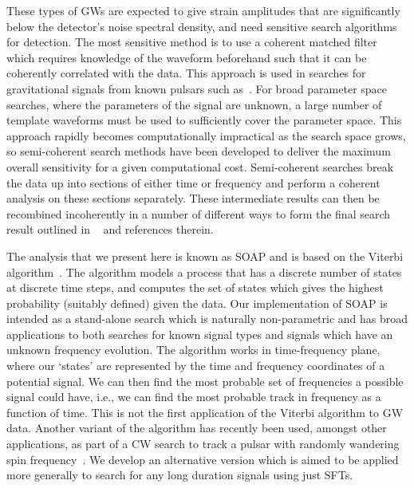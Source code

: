 %
%
These types of \acp{GW} are expected to give strain amplitudes that are significantly below the detector's noise spectral density, and need sensitive search algorithms for detection. The most sensitive method is to use a coherent matched filter which requires knowledge of the waveform beforehand such that it can be coherently correlated with the data. This approach is used in searches for gravitational signals from known pulsars such as~\citep{dupuis2005BayesianEstimation,astone2010MethodDetection,schutz1998DataAnalysis,collaboration2017FirstSearch,abbott2019SearchesGravitational}. For broad parameter space searches, where the parameters of the signal are unknown, a large number of template waveforms must be used to sufficiently cover the parameter space.  This approach rapidly becomes computationally impractical as the search space grows, so semi-coherent search methods have been developed to deliver the maximum overall sensitivity for a given computational cost. Semi-coherent searches break the data up into sections of either time or frequency and perform a coherent analysis on these sections separately. These intermediate results can then be recombined incoherently in a number of different ways to form the final search result outlined in ~\citep{creighton2000SearchingPeriodic,abbott2019AllskySearch} and references therein.


%
%
The analysis that we present here is known as SOAP \citep{ellis2006SnakesPlanea} and is based on the Viterbi algorithm~\citep{viterbi1967ErrorBounds}. The algorithm models a process that has a discrete number of states at discrete time steps, and computes the set of states which gives the highest probability (suitably defined) given the data. Our implementation of SOAP is intended as a stand-alone search which is naturally non-parametric and has broad applications to both searches for known signal types and signals which have an unknown frequency evolution. The algorithm works in time-frequency plane, where our `states' are represented by the time and frequency coordinates of a potential signal. We can then find the most probable set of frequencies a possible signal could have, i.e., we can find the most probable track in frequency as a function of time. This is not the first application of the Viterbi algorithm to \ac{GW} data. Another variant of the algorithm \citep{suvorova2016HiddenMarkova} has recently been used, amongst other applications, as part of a \ac{CW} search to track a pulsar with randomly wandering spin frequency~\citep{sun2018HiddenMarkov, suvorova2017HiddenMarkov,abbott2017SearchGravitational, abbott2018SearchGravitational, sun2018ApplicationHidden}. We develop an alternative version which is aimed to be applied more generally to search for any long duration signals using just \acp{SFT}.

